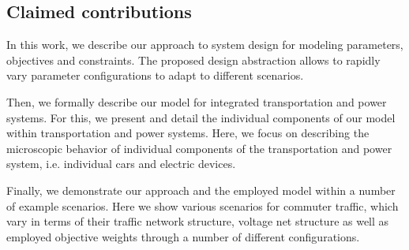 \subsection{Claimed contributions}
\label{contributions}

In this work, we describe our approach to system design for modeling parameters, objectives and constraints. The proposed design abstraction allows to rapidly vary parameter configurations to adapt to different scenarios.

Then, we formally describe our model for integrated transportation and power systems. For this, we present and detail the individual components of our model within transportation and power systems. Here, we focus on describing the microscopic behavior of individual components of the transportation and power system, i.e. individual cars and electric devices.


Finally, we demonstrate our approach and the employed model within a number of example scenarios. Here we show various scenarios for commuter traffic, which vary in terms of their traffic network structure, voltage net structure as well as employed objective weights through a number of different configurations.
